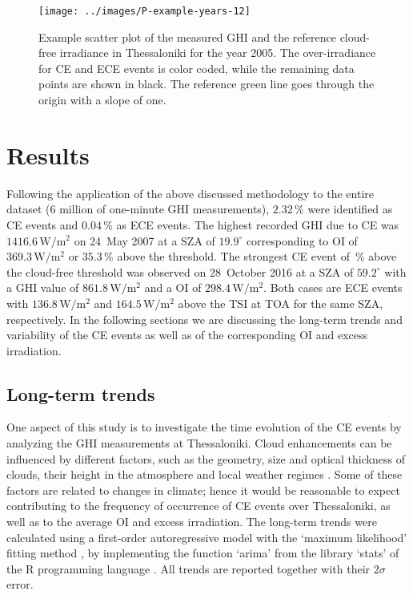 \documentclass[preprint, 5p,
authoryear]{elsarticle} %
\begin{document}
\begin{figure}[H]

{\centering \texttt{[image: ../images/P-example-years-12]} 

}

\caption{Example scatter plot of the measured GHI and the reference cloud-free irradiance in Thessaloniki for the year 2005. The over-irradiance for CE and ECE events is color coded, while the remaining data points are shown in black. The reference green line goes through the origin with a slope of one.}\label{fig:example-year}
\end{figure}

\hypertarget{results}{%
\section{Results}\label{results}}

Following the application of the above discussed methodology to the
entire dataset (\(6\) million of one-minute GHI measurements),
\(2.32\,\%\) were identified as CE events and \(0.04\,\%\) as ECE
events. The highest recorded GHI due to CE was
\(1416.6\,\text{W}/\text{m}^2\) on 24~May 2007 at a SZA of
\(19.9^\circ\) corresponding to OI of \(369.3\,\text{W}/\text{m}^2\) or
\(35.3\,\%\) above the threshold. The strongest CE event of \(\,\%\)
above the cloud-free threshold was observed on 28~October 2016 at a SZA
of \(59.2^\circ\) with a GHI value of \(861.8\,\text{W}/\text{m}^2\) and
a OI of \(298.4\,\text{W}/\text{m}^2\). Both cases are ECE events with
\(136.8\,\text{W}/\text{m}^2\) and \(164.5\,\text{W}/\text{m}^2\) above
the TSI at TOA for the same SZA, respectively. In the following sections
we are discussing the long-term trends and variability of the CE events
as well as of the corresponding OI and excess irradiation.

\hypertarget{long-term-trends}{%
\subsection{Long-term trends}\label{long-term-trends}}

One aspect of this study is to investigate the time evolution of the CE
events by analyzing the GHI measurements at Thessaloniki. Cloud
enhancements can be influenced by different factors, such as the
geometry, size and optical thickness of clouds, their height in the
atmosphere and local weather regimes
\citep{Mol2023, Veerman2022, Gristey2022, Tzoumanikas2016}. Some of
these factors are related to changes in climate; hence it would be
reasonable to expect contributing to the frequency of occurrence of CE
events over Thessaloniki, as well as to the average OI and excess
irradiation. The long-term trends were calculated using a first-order
autoregressive model with the `maximum likelihood' fitting method
\citep{Gardner1980, Jones1980}, by implementing the function `arima'
from the library `stats' of the R programming language \citep{RCT2023}.
All trends are reported together with their \(2\sigma\) error.
\end{document}
